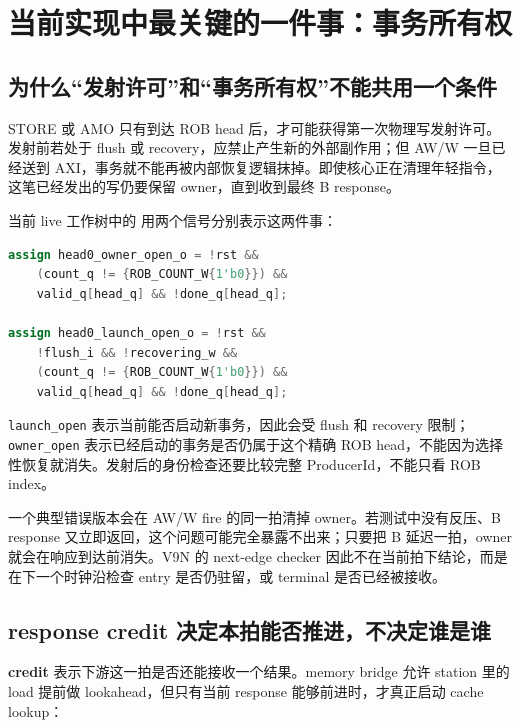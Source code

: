 \documentclass[UTF8,a4paper,zihao=-4,oneside]{ctexart}
\newcommand{\taskpath}[1]{\path{#1}}
\begin{document}
\section{当前实现中最关键的一件事：事务所有权}

\subsection{为什么“发射许可”和“事务所有权”不能共用一个条件}

STORE 或 AMO 只有到达 ROB head 后，才可能获得第一次物理写发射许可。发射前若处于 flush 或 recovery，应禁止产生新的外部副作用；但 AW/W 一旦已经送到 AXI，事务就不能再被内部恢复逻辑抹掉。即使核心正在清理年轻指令，这笔已经发出的写仍要保留 owner，直到收到最终 B response。

当前 live 工作树中的 \taskpath{OooRob.v} 用两个信号分别表示这两件事：

\noindent\begin{minipage}{\linewidth}
\begin{lstlisting}[language=Verilog,firstnumber=528,
  caption={ROB head 的首次发射许可与发射后所有权},
  label={code:rob-launch-owner}]
assign head0_owner_open_o = !rst &&
    (count_q != {ROB_COUNT_W{1'b0}}) &&
    valid_q[head_q] && !done_q[head_q];

assign head0_launch_open_o = !rst &&
    !flush_i && !recovering_w &&
    (count_q != {ROB_COUNT_W{1'b0}}) &&
    valid_q[head_q] && !done_q[head_q];
\end{lstlisting}
\end{minipage}

\texttt{launch\_open} 表示当前能否启动新事务，因此会受 flush 和 recovery 限制；\texttt{owner\_open} 表示已经启动的事务是否仍属于这个精确 ROB head，不能因为选择性恢复就消失。发射后的身份检查还要比较完整 ProducerId，不能只看 ROB index。

一个典型错误版本会在 AW/W fire 的同一拍清掉 owner。若测试中没有反压、B response 又立即返回，这个问题可能完全暴露不出来；只要把 B 延迟一拍，owner 就会在响应到达前消失。V9N 的 next-edge checker 因此不在当前拍下结论，而是在下一个时钟沿检查 entry 是否仍驻留，或 terminal 是否已经被接收。

\subsection{response credit 决定本拍能否推进，不决定谁是谁}

\textbf{credit} 表示下游这一拍是否还能接收一个结果。memory bridge 允许 station 里的 load 提前做 lookahead，但只有当前 response 能够前进时，才真正启动 cache lookup：
\end{document}

